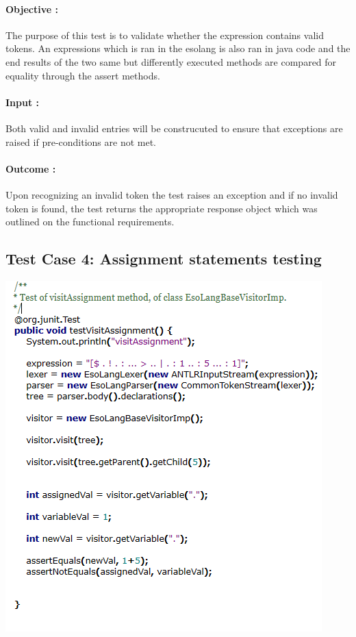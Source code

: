\documentclass[english]{article}
\begin{document}
			\paragraph{Objective :}The purpose of this test is to validate whether the expression contains valid tokens. An expressions which is ran in the esolang is also ran in java code and the end results of the two same but differently executed methods are compared for equality through the assert methods.
			\paragraph{Input :} Both valid and invalid entries will be construcuted to ensure that exceptions are raised if pre-conditions are not met.
			\paragraph{Outcome :} Upon recognizing an invalid token the test raises an exception and if no invalid token is found, the test returns the  appropriate response object  which was outlined on the functional requirements.  \\
			
				\subsection{Test Case 4: Assignment statements testing} 
				\includegraphics[width=\linewidth]{assignment.png}
				
\end{document}
